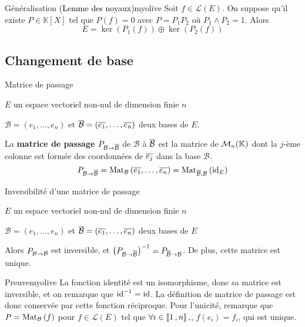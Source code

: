     \begin{omed}{Généralisation \textcolor{black}{(Lemme des noyaux)}}{myolive}
        Soit $f \in \mathcal{L}(E)$. On suppose qu’il existe $P \in \mathbb{K}[X]$ tel que $P(f) = 0$ avec $P = P_1 P_2$ où $P_1 \wedge P_2 = 1$. Alors 
        \[ E = \ker(P_1(f)) \oplus \ker(P_2(f)) \]  
    \end{omed}

\subsection{Changement de base}

    \begin{defi}{Matrice de passage}{}
        \begin{soient}
            \item $E$ un espace vectoriel non-nul de dimension finie $n$
            \item $\mathcal{B} = (e_1, \ldots, e_n)$ et $\overline{\mathcal{B}} = (\overline{e_1}, \ldots, \overline{e_n})$ deux bases de $E$.
        \end{soient}
        La \textbf{matrice de passage} $P_{\mathcal{B} \rightarrow \overline{\mathcal{B}}}$ de $\mathcal{B}$ à $\overline{\mathcal{B}}$ est la matrice de $\mathcal{M}_{n}(\mathbb{K})$ dont la $j$-ème colonne est formée des coordonnées de $\overline{e_j}$ dans la base $\mathcal{B}$. 
        \[ P_{\mathcal{B} \rightarrow \overline{\mathcal{B}}} = \text{Mat}_{\mathcal{B}}\left(\overline{e_1},\ldots,\overline{e_n}\right) = \text{Mat}_{\overline{\mathcal{B}},\mathcal{B}}\left(\operatorname{id}_E\right) \]
    \end{defi}

    \begin{prop}{Inversibilité d’une matrice de passage}{}
        \begin{soient}
            \item $E$ un espace vectoriel non-nul de dimension finie $n$
            \item $\mathcal{B} = (e_1,\ldots,e_n)$ et $\overline{\mathcal{B}} = \left(\overline{e_1}, \ldots, \overline{e_n}\right)$ deux bases de $E$
        \end{soient}
        Alors $P_{\mathcal{B} \rightarrow \bar{\mathcal{B}}}$ est inversible, et $\left(P_{\mathcal{B} \rightarrow \overline{\mathcal{B}}}\right)^{-1} = P_{\overline{\mathcal{B}} \rightarrow \mathcal{B}}$. De plus, cette matrice est unique.
    \end{prop}

    \begin{demo}{Preuve}{myolive}
        La fonction identité est un isomorphisme, donc sa matrice est inversible, et on remarque que $\operatorname{id}^{-1} = \operatorname{id}$. La définition de matrice de passage est donc conservée par cette fonction réciproque. Pour l’unicité, remarque que $P = \text{Mat}_{\mathcal{B}}\left(f\right)$ pour $f \in \mathcal{L}(E)$ tel que $\forall i \in \left\llbracket 1 \, , n \right\rrbracket,$, $f(e_i) = f_i$, qui est unique.
    \end{demo}

